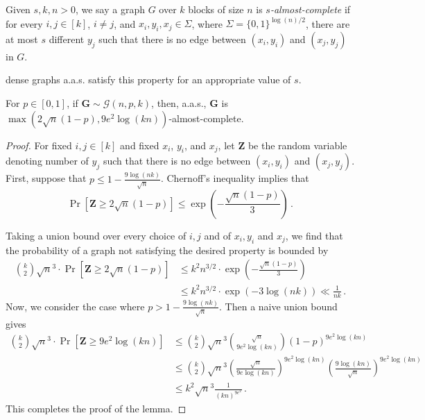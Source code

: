 \documentclass[10pt,a4paper]{article}
\makeatletter
\theoremstyle{definition}
\theoremstyle{remark}
\theoremstyle{example}
\theoremstyle{plain}
\newcommand{\calG}{\mathcal{G}}
\newcommand{\random}[1]{\bm{#1}}
\newcommand{\aas}{a.a.s.\@\xspace}
\newcommand{\ndense}{almost-complete\xspace}
\makeatother
\begin{document}
\begin{definition}\label{def:neighbor-dense}

Given $s,k,n > 0$, we say a graph $G$ over $k$ blocks of size $n$ is \emph{$s$-\ndense} if for every $i,j\in [k]$, $i\neq j$,  
and $x_i,y_i, x_j \in \Sigma$, where $\Sigma = \{0,1\}^{\log (n)/2}$, there are at most $s$ different $y_j$ such that there is no edge between $(x_i,y_i)$ and $(x_j,y_j)$ in $G$.
\end{definition}
  dense graphs \aas satisfy this property for an appropriate value of $s$. 

\begin{lemma}
    \label{lemma:probability-concentrates}
    For $p \in [0,1]$, if $\random{G} \sim  \calG(n,p,k)$, then, \aas, $\random{G}$ is $\max(2\sqrt{n}(1-p),9e^2\log(kn))$-\ndense.
\end{lemma}

{}{
\begin{proof}
    For fixed 
    $i,j\in [k]$
    and fixed $x_i$, $y_i$, and $x_j$, let $\random{Z}$ be the random variable denoting number of $y_j$ such that there is no edge between $(x_i,y_i)$ and $(x_j,y_j)$. First, suppose that $p\leq1-\frac{9\log(nk)}{\sqrt n}$. Chernoff's inequality implies that 
    \begin{equation*}
        \Pr[\random{Z}\geq2\sqrt{n}(1-p)] \leq \exp\left ( -\frac{\sqrt{n}(1-p)}{3}\right)\,. 
    \end{equation*}

    Taking a union bound over every choice of $i,j$ and of $x_i,y_i$ and $x_j$,
    we find that the probability of a graph not satisfying the desired property is bounded by 
    \begin{align*}
        \binom{k}{2}\sqrt{n}^3 \cdot 
        \Pr[\random{Z}\geq 
        2\sqrt{n}(1-p)] &\leq k^2 n^{3/2} \cdot \exp\left (- \frac{\sqrt{n}(1-p)}{3}\right)
        \\
        &\leq k^2n^{3/2}\cdot \exp(-3\log(nk))\ll \frac{1}{nk}\,. 
    \end{align*}
    Now, we consider the case where $p > 1-\frac{9\log(nk)}{\sqrt n}$. Then a naive union bound gives
    \begin{align*}
         \binom{k}{2}\sqrt{n}^3 \cdot 
         \Pr[\random{Z}\geq 
         9e^2\log(kn)] &\leq 
         \binom{k}{2}\sqrt{n}^3 
         \binom{\sqrt n}{9e^2\log(kn)}
         (1-p)^{9e^2\log(kn)}\\
         &\leq \binom{k}{2}\sqrt{n}^3 
         \left(\frac{\sqrt n}
         {9e\log(kn)}\right)^{9e^2\log(kn)}
         \left(\frac{9\log(kn)}
         {\sqrt n}\right)^{9e^2\log(kn)}\\
         &\leq k^2 \sqrt{n}^3 \frac{1}{(kn)^{9e^2}}\,. 
    \end{align*}
    This completes the proof of the lemma.
\end{proof}
}
\end{document}
